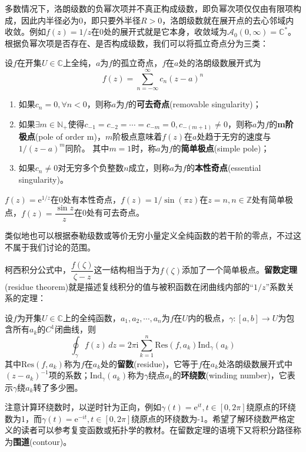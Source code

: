 \documentclass{ctexbook}
\begin{document}
多数情况下，洛朗级数的负幂次项并不真正构成级数，即负幂次项仅仅由有限项构成，因此内半径必为0，即只要外半径$R>0$，洛朗级数就在展开点的去心邻域内收敛。例如$f(z)=1/z$在0处的展开式就是它本身，收敛域为$\mathcal{A}_0(0,\infty)=\mathbb{C}^*$。根据负幂次项是否存在、是否构成级数，我们可以将孤立奇点分为三类：
\begin{definition}[孤立奇点的分类]
    设$f$在开集$U\in\mathbb{C}$上全纯，$a$为$f$的孤立奇点，$f$在$a$处的洛朗级数展开式为
    \[f(z)=\sum_{n=-\infty}^{\infty}c_n(z-a)^n\]
    \begin{enumerate}
        \item 如果$c_n=0,\forall n<0$，则称$a$为$f$的\textbf{可去奇点}(removable singularity)；
        \item 如果$\exists m\in\mathbb{N}_+$使得$c_{-1}=c_{-2}=\cdots=c_{-m}=0,c_{-(m+1)}\neq 0$，则称$a$为$f$的\textbf{m阶极点}(pole of order m)，$m$阶极点意味着$f(z)$在$a$处趋于无穷的速度与$1/(z-a)^m$同阶。
        其中$m=1$时，称$a$为$f$的\textbf{简单极点}(simple pole)；
        \item 如果$c_n\neq 0$对无穷多个负整数$n$成立，则称$a$为$f$的\textbf{本性奇点}(essential singularity)。
    \end{enumerate}
\end{definition}
\begin{example}
$f(z)=\mathrm{e}^{1/z}$在0处有本性奇点，$f(z)=1/\sin(\pi z)$在$z=n,n\in\mathbb{Z}$处有简单极点，$f(z)=\dfrac{\sin z}{z}$在0处有可去奇点。
\end{example}

类似地也可以根据泰勒级数或等价无穷小量定义全纯函数的若干阶的零点，不过这不属于我们讨论的范围。

柯西积分公式中，$\dfrac{f(\zeta)}{\zeta-z}$这一结构相当于为$f(\zeta)$添加了一个简单极点。\textbf{留数定理}(residue theorem)就是描述复线积分的值与被积函数在闭曲线内部的“$1/z$”系数关系的定理：
\begin{theorem}[留数定理]
    设$f$为开集$U\in\mathbb{C}$上的全纯函数，$a_1,a_2,\cdots,a_n$为$f$在$U$内的极点，$\gamma:[a,b]\to U$为包含所有$a_k$的$C^1$闭曲线，则
    \[\oint_{\gamma}f(z)\,dz=2\pi \mathrm{i}\sum_{k=1}^{n}\text{Res}(f,a_k)\text{Ind}_{\gamma}(a_k)\]
    其中$\text{Res}(f,a_k)$称为$f$在$a_k$处的\textbf{留数}(residue)，它等于$f$在$a_k$处洛朗级数展开式中$(z-a_k)^{-1}$项的系数；$\text{Ind}_{\gamma}(a_k)$称为$\gamma$绕点$a_k$的\textbf{环绕数}(winding number)，它表示$\gamma$绕$a_k$转了多少圈。
\end{theorem}
注意计算环绕数时，以逆时针为正向，例如$\gamma(t)=\mathrm{e}^{it},t\in[0,2\pi]$绕原点的环绕数为1，而$\gamma(t)=\mathrm{e}^{-it},t\in[0,2\pi]$绕原点的环绕数为-1。希望了解环绕数严格定义的读者可以参考复变函数或拓扑学的教材。在留数定理的语境下又将积分路径称为\textbf{围道}(contour)。
\end{document}
